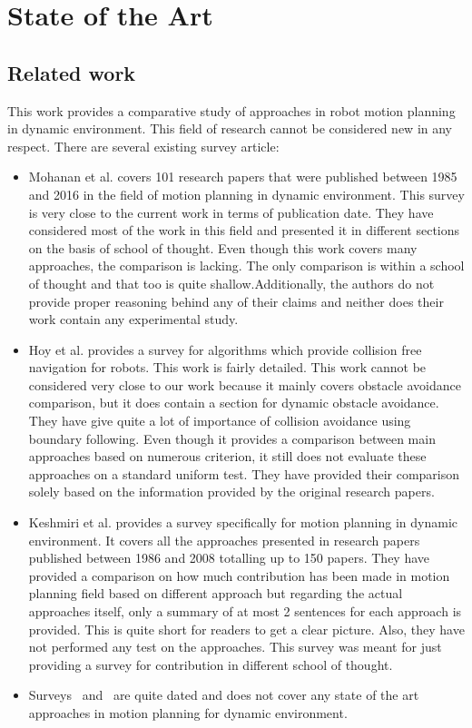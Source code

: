 
\chapter{State of the Art}

\section{Related work}%
\label{sec:related_work}


This work provides a comparative study of approaches in robot motion planning in dynamic environment. This field of research cannot be considered new in any respect. There are several existing survey article:

\begin{itemize}
\item Mohanan et al.\cite{mohanan2018a} covers 101 research papers that were published between 1985 and 2016 in the field of motion planning in dynamic environment. 
This survey is very close to the current work in terms of publication date.
They have considered most of the work in this field and presented it in different sections on the basis of school of thought.
Even though this work covers many approaches, the comparison is lacking. The only comparison is within a school of thought and that too is quite shallow.Additionally, the authors do not provide proper reasoning behind any of their claims and neither does their work contain any experimental study. 
\item Hoy et al.\cite{hoy2015algorithms} provides a survey for algorithms which provide collision free navigation for robots. 
This work is fairly detailed.
This work cannot be considered very close to our work because it mainly covers obstacle avoidance comparison, but it does contain a section for dynamic obstacle avoidance.
They have give quite a lot of importance of collision avoidance using boundary following.
Even though it provides a comparison between main approaches based on numerous criterion, it still does not evaluate these approaches on a standard uniform test. They have provided their comparison solely based on the information provided by the original research papers.
\item Keshmiri et al.\cite{keshmiri2009overview} provides a survey specifically for motion planning in dynamic environment. 
It covers all the approaches presented in research papers published between 1986 and 2008 totalling up to 150 papers. 
They have provided a comparison on how much contribution has been made in motion planning field based on different approach but regarding the actual approaches itself, only a summary of at most 2 sentences for each approach is provided. This is quite short for readers to get a clear picture. Also, they have not performed any test on the approaches. This survey was meant for just providing a survey for contribution in different school of thought.
\item Surveys~\cite{fujimura1991motion} and~\cite{tsubouchi1996motion} are quite dated and does not cover any state of the art approaches in motion planning for dynamic environment.
\end{itemize}

